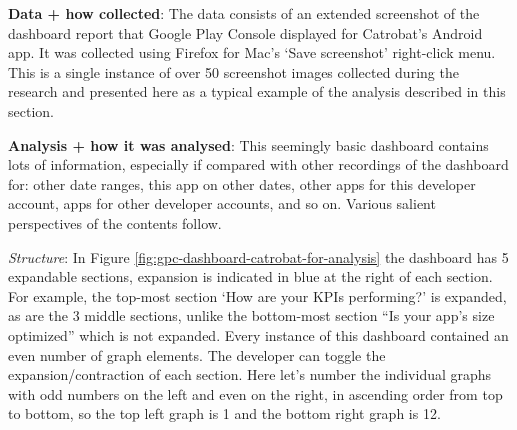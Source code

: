 \textbf{Data + how collected}: The data consists of an extended screenshot of the dashboard report that Google Play Console displayed for Catrobat's  Android app. It was collected using Firefox for Mac's `Save screenshot' right-click menu. This is a single instance of over 50 screenshot images collected during the research and presented here as a typical example of the analysis described in this section.

\textbf{Analysis + how it was analysed}: This seemingly basic dashboard contains lots of information, especially if compared with other recordings of the dashboard for: other date ranges, this app on other dates, other apps for this developer account, apps for other developer accounts, and so on. Various salient perspectives of the contents follow.

\textit{Structure}: 
In Figure \ref{fig:gpc-dashboard-catrobat-for-analysis} the dashboard has 5 expandable sections, expansion is indicated in blue at the right of each section. For example, the top-most section `How are your KPIs performing?' is expanded, as are the 3 middle sections, unlike the bottom-most section ``Is your app's size optimized'' which is not expanded. Every instance of this dashboard contained an even number of graph elements. The developer can toggle the expansion/contraction of each section. Here let's number the individual graphs with odd numbers on the left and even on the right, in ascending order from top to bottom, so the top left graph is 1 and the bottom right graph is 12.

